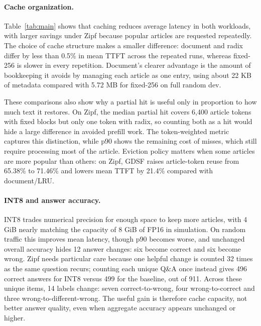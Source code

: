 \documentclass{article}
\begin{document}
\paragraph*{Cache organization.}
Table~\ref{tab:main} shows that caching reduces average latency in both
workloads, with larger savings under Zipf because popular articles are
requested repeatedly. The choice of cache structure makes a smaller
difference: document and radix differ by less than 0.5\% in mean TTFT across
the repeated runs, whereas fixed-256 is slower in every repetition.
Document's clearer advantage is the amount of bookkeeping it avoids by
managing each article as one entry, using about 22 KB of metadata compared
with 5.72 MB for fixed-256 on full random dev.

These comparisons also show why a partial hit is useful only in proportion
to how much text it restores. On Zipf, the median partial hit covers 6,400
article tokens with fixed blocks but only one token with radix, so counting
both as a hit would hide a large difference in avoided prefill work.
The token-weighted metric captures this distinction, while p90 shows the
remaining cost of misses, which still require processing most of the article.
Eviction policy matters when some articles are more popular than others:
on Zipf, GDSF raises article-token reuse from 65.38\% to 71.46\% and lowers
mean TTFT by 21.4\% compared with document/LRU.

\paragraph*{INT8 and answer accuracy.}
INT8 trades numerical precision for enough space to keep more articles,
with 4 GiB nearly matching the capacity of 8 GiB of FP16 in simulation.
On random traffic this improves mean latency, though p90 becomes worse,
and unchanged overall accuracy hides 12 answer changes: six become correct
and six become wrong. Zipf needs particular care because one helpful change
is counted 32 times as the same question recurs; counting each unique Q\&A
once instead gives 496 correct answers for INT8 versus 499 for the baseline,
out of 911. Across these unique items, 14 labels change: seven correct-to-wrong,
four wrong-to-correct and three wrong-to-different-wrong. The useful gain is
therefore cache capacity, not better answer quality, even when aggregate
accuracy appears unchanged or higher.
\end{document}
